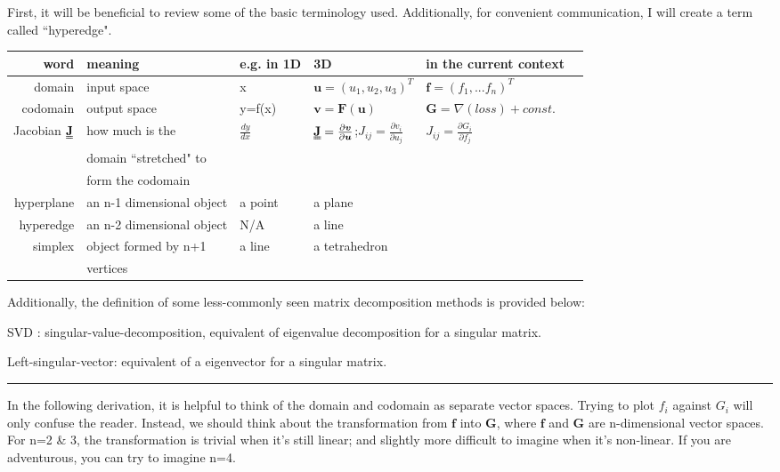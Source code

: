 \documentclass[a4paper, 12pt]{article}
\newcommand{\matr}[1]{\uuline{\bf{#1}}}
\newcommand{\ve}[1]{\boldsymbol{#1}}
\begin{document}
\begin{appendices}
First, it will be beneficial to review some of the basic terminology used. Additionally, for convenient communication, I will create a term called ``hyperedge".
\begin{table}[H]
    \begin{tabular}{rlllll}
    word & meaning & e.g. in 1D & 3D & in the current context\\
    \hline
    domain  &   input space & x      & $\ve{u}=(u_1,u_2,u_3)^T$ & $\ve{f}=(f_1,...f_n)^T$\\
    codomain& output space & y=f(x) & $\ve{v}=\ve{F}(\ve{u})$& $\ve{G}=\nabla(loss)+ const.$\\
    Jacobian $\matr{J}$&how much is the&  $\frac{dy}{dx}$ & $\matr{J}=\frac{\partial\ve{v}}{\partial\ve{u}}$;$J_{ij} = \frac{\partial v_i}{\partial u_j}$ & $J_{ij} = \frac{\partial G_i}{\partial f_j}$ \\
            &domain ``stretched" to \\
            &form the codomain \\
    hyperplane & an n-1 dimensional object & a point & a plane &\\
    hyperedge & an n-2 dimensional object & N/A & a line \\
    simplex & object formed by n+1  & a line & a tetrahedron\\
            & vertices
    \end{tabular}
\end{table}
Additionally, the definition of some less-commonly seen matrix decomposition methods is provided below:
    
    SVD : singular-value-decomposition, equivalent of eigenvalue decomposition for a singular matrix.

    Left-singular-vector: equivalent of a eigenvector for a singular matrix.

\hrule

In the following derivation, it is helpful to think of the domain and codomain as separate vector spaces.
Trying to plot $f_i$ against $G_i$ will only confuse the reader. Instead, we should think about the transformation from $\ve{f}$ into $\ve{G}$, where $\ve{f}$ and $\ve{G}$ are n-dimensional vector spaces. For n=2 \& 3, the transformation is trivial when it's still linear; and slightly more difficult to imagine when it's non-linear. If you are adventurous, you can try to imagine n=4.


\end{appendices}
\end{document}
